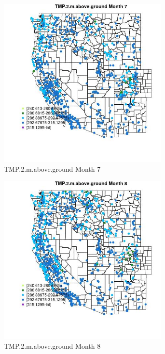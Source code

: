 \begin{figure} 
\centering  
\includegraphics[width=0.77\textwidth]{Code_Outputs/Report_ML_input_PM25_Step4_part_f_de_duplicated_aveswNAs_MapObsMo7TMP2maboveground.jpg} 
\caption{\label{fig:Report_ML_input_PM25_Step4_part_f_de_duplicated_aveswNAsMapObsMo7TMP2maboveground}TMP.2.m.above.ground Month 7} 
\end{figure} 
 

\clearpage 

\begin{figure} 
\centering  
\includegraphics[width=0.77\textwidth]{Code_Outputs/Report_ML_input_PM25_Step4_part_f_de_duplicated_aveswNAs_MapObsMo8TMP2maboveground.jpg} 
\caption{\label{fig:Report_ML_input_PM25_Step4_part_f_de_duplicated_aveswNAsMapObsMo8TMP2maboveground}TMP.2.m.above.ground Month 8} 
\end{figure} 
 

